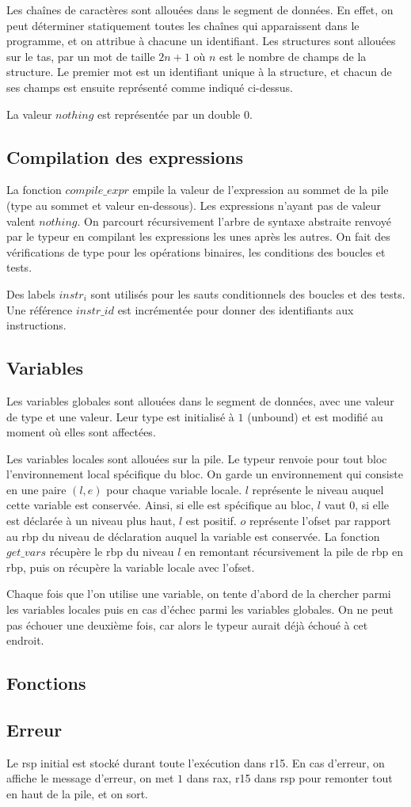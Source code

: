 \documentclass[10pt,a4paper]{article}
\begin{document}
Les chaînes de caractères sont allouées dans le segment de données. En effet, on peut déterminer statiquement toutes les chaînes qui apparaissent dans le programme, et on attribue à chacune un identifiant. Les structures sont allouées sur le tas, par un mot de taille $2n+1$ où $n$ est le nombre de champs de la structure. Le premier mot est un identifiant unique à la structure, et chacun de ses champs est ensuite représenté comme indiqué ci-dessus. 

La valeur $nothing$ est représentée par un double $0$. 

\subsection{Compilation des expressions}
La fonction $compile\_expr$ empile la valeur de l'expression au sommet de la pile (type au sommet et valeur en-dessous). Les expressions n'ayant pas de valeur valent $nothing$. On parcourt récursivement l'arbre de syntaxe abstraite renvoyé par le typeur en compilant les expressions les unes après les autres. On fait des vérifications de type pour les opérations binaires, les conditions des boucles et tests. 

Des labels $instr_i$ sont utilisés pour les sauts conditionnels des boucles et des tests. Une référence $instr\_id$ est incrémentée pour donner des identifiants aux instructions.

\subsection{Variables}
Les variables globales sont allouées dans le segment de données, avec une valeur de type et une valeur. Leur type est initialisé à $1$ (unbound) et est modifié au moment où elles sont affectées. 

Les variables locales sont allouées sur la pile. Le typeur renvoie pour tout bloc l'environnement local spécifique du bloc. On garde un environnement qui consiste en une paire $(l,e)$ pour chaque variable locale. $l$ représente le niveau auquel cette variable est conservée. Ainsi, si elle est spécifique au bloc, $l$ vaut $0$, si elle est déclarée à un niveau plus haut, $l$ est positif. $o$ représente l'ofset par rapport au rbp du niveau de déclaration auquel la variable est conservée. La fonction $get\_vars$ récupère le rbp du niveau $l$ en remontant récursivement la pile de rbp en rbp, puis on récupère la variable locale avec l'ofset.

Chaque fois que l'on utilise une variable, on tente d'abord de la chercher parmi les variables locales puis en cas d'échec parmi les variables globales. On ne peut pas échouer une deuxième fois, car alors le typeur aurait déjà échoué à cet endroit.

\subsection{Fonctions}

\subsection{Erreur}
Le rsp initial est stocké durant toute l'exécution dans r15. En cas d'erreur, on affiche le message d'erreur, on met $1$ dans rax, r15 dans rsp pour remonter tout en haut de la pile, et on sort.
\end{document}
